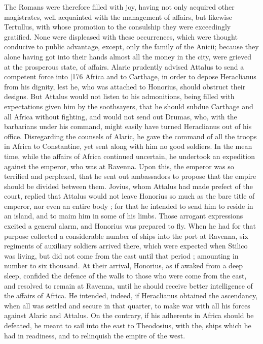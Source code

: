 The Romans were therefore filled with joy, having not only acquired other magistrates, well acquainted with the management of affairs, but likewise Tertullus, with whose promotion to the consulship they were exceedingly gratified. None were displeased with these occurrences, which were thought conducive to public advantage, except, only the family of the Anicii; because they alone having got into their hands almost all the money in the city, were grieved at the prosperous state, of affairs. Alaric prudently advised Attalus to send a competent force into
|176 Africa and to Carthage, in order to depose Heraclianus from his dignity, lest he, who was attached to Honorius, should obstruct their designs. But Attalus would not listen to his admonitions, being filled with expectations given him by the soothsayers, that he should subdue Carthage and all Africa without fighting, and would not send out Drumas, who, with the barbarians under his command, might easily have turned Heraclianus out of his office. Disregarding the counsels of Alaric, he gave the command of all the troops in Africa to Constantine, yet sent along with him no good soldiers. In the mean time, while the affairs of Africa continued uncertain, he undertook an expedition against the emperor, who was at Ravenna. Upon this, the emperor was so terrified and perplexed, that he sent out ambassadors to propose that the empire should be divided between them. Jovius, whom Attalus had made prefect of the court, replied that Attalus would not leave Honorius so much as the bare title of emperor, nor even an entire body ; for that he intended to send him to reside in an island, and to maim him in some of his limbs. Those arrogant expressions excited a general alarm, and Honorius was prepared to fly. When he had for that purpose collected a considerable number of ships into the port at Ravenna, six regiments of auxiliary soldiers arrived there, which were expected when Stilico was living, but did not come from the east until that period ; amounting in number to six thousand. At their arrival, Honorius, as if awaked from a deep sleep, confided the defence of the walls to those who were come from the east, and resolved to remain at Ravenna, until he should receive better intelligence of the affairs of Africa. He intended, indeed, if Heraclianus obtained the ascendancy, when all was settled and secure in that quarter, to make war with all his forces against Alaric and Attalus. On the contrary, if his adherents in Africa should be defeated, he meant to sail into the east to Theodosius, with the, ships which he had in readiness, and to relinquish the empire of the west.

